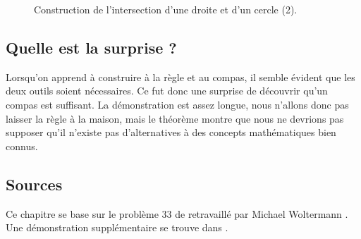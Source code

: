 \begin{figure}[htbp]
\centering
{}

\caption{Construction de l'intersection d'une droite et d'un cercle  (2).}\label{f.compass-circle5}
\end{figure}




\subsection*{Quelle est la surprise ?}

Lorsqu'on apprend à construire à la règle et au compas, il semble évident que les deux outils soient nécessaires. Ce fut donc une surprise de découvrir qu'un compas est suffisant. La démonstration est assez longue, nous n'allons donc pas laisser la règle à la maison, mais le théorème montre que nous ne devrions pas supposer qu'il n'existe pas d'alternatives à des concepts mathématiques bien connus.

\subsection*{Sources}

Ce chapitre se base sur le problème $33$ de \cite{dorrie1} retravaillé par Michael Woltermann \cite{dorrie2}. Une démonstration supplémentaire se trouve dans \cite{mm}.
